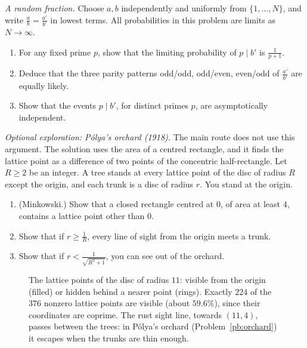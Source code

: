 \begin{exercise}[$\star\star$]\label{pb:parity}
\emph{A random fraction.} Choose $a,b$ independently and uniformly from
$\{1,\ldots,N\}$, and write $\frac ab=\frac{a'}{b'}$ in lowest terms.
All probabilities in this problem are limits as $N\to\infty$.
\begin{enumerate}[label=(\alph*)]
\item For any fixed prime $p$, show that the limiting probability of $p\mid b'$ is $\frac1{p+1}$.
\item Deduce that the three parity patterns odd/odd, odd/even, even/odd of $\frac{a'}{b'}$ are equally likely.
\item Show that the events $p\mid b'$, for distinct primes $p$, are asymptotically independent.
\end{enumerate}
\end{exercise}

\begin{exercise}[$\star\star\star$]\label{pb:orchard}
\emph{Optional exploration: Pólya's orchard (1918).} The main route does not use this argument. The solution uses the area of a centred rectangle, and it finds the lattice point as a difference of two points of the concentric half-rectangle. Let $R\ge2$ be an integer. A tree stands at every lattice point of the disc of radius $R$ except
the origin, and each trunk is a disc of radius $r$. You stand at the origin.
\begin{enumerate}[label=(\alph*)]
\item (Minkowski.) Show that a closed rectangle centred at $0$, of area at least $4$, contains a lattice point other than $0$.
\item Show that if $r\ge\frac1R$, every line of sight from the origin meets a trunk.
\item Show that if $r<\frac1{\sqrt{R^2+1}}$, you can see out of the orchard.
\end{enumerate}
\end{exercise}

\begin{figure}[ht]
\centering
{}
\caption{The lattice points of the disc of radius $11$: visible from the origin (filled) or hidden behind a nearer point (rings).
Exactly $224$ of the $376$ nonzero lattice points are visible (about $59.6\%$), since their coordinates are coprime. The rust sight line, towards $(11,4)$,
passes between the trees: in Pólya's orchard (Problem~\ref{pb:orchard}) it escapes when the trunks are thin enough.}
\label{fig:visible}
\end{figure}

